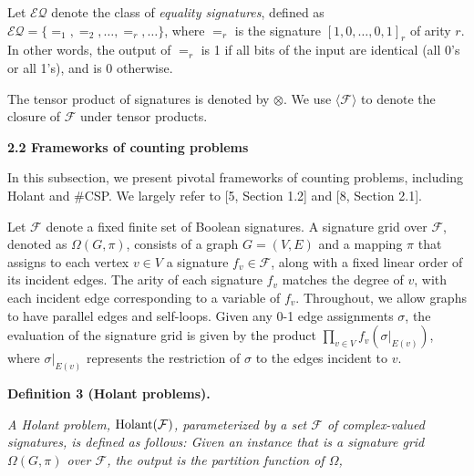 Let $\mathcal{EQ}$ denote the class of \emph{equality signatures}, defined as $\mathcal{EQ}=\{=_{1},=_{2},\ldots,=_{r},\ldots\}$, where $=_{r}$ is the signature $[1,0,\ldots,0,1]_{r}$ of arity $r$. In other words, the output of $=_{r}$ is 1 if all bits of the input are identical (all 0’s or all 1’s), and is 0 otherwise.\par




The tensor product of signatures is denoted by $\otimes$. We use $\langle\mathcal{F}\rangle$ to denote the closure of $\mathcal{F}$ under tensor products.\par





\par\medskip\noindent\textbf{
2.2 Frameworks of counting problems}\par




In this subsection, we present pivotal frameworks of counting problems, including Holant and \#CSP. We largely refer to [5, Section 1.2] and [8, Section 2.1].\par




Let $\mathcal{F}$ denote a fixed finite set of Boolean signatures. A signature grid over $\mathcal{F}$, denoted as $\Omega(G,\pi)$, consists of a graph $G=(V,E)$ and a mapping $\pi$ that assigns to each vertex $v\in V$ a signature $f_{v}\in\mathcal{F}$, along with a fixed linear order of its incident edges. The arity of each signature $f_{v}$ matches the degree of $v$, with each incident edge corresponding to a variable of $f_{v}$. Throughout, we allow graphs to have parallel edges and self-loops. Given any 0-1 edge assignments $\sigma$, the evaluation of the signature grid is given by the product $\prod_{v\in V}f_{v}(\sigma|_{E(v)})$, where $\sigma|_{E(v)}$ represents the restriction of $\sigma$ to the edges incident to $v$.\par





\par\medskip\noindent\textbf{
\textbf{Definition 3}\textbf{ }(Holant problems)\textbf{.}
}\par



\emph{A Holant problem, $\textup{{Holant}}(\mathcal{F})$, parameterized by a set $\mathcal{F}$ of complex-valued signatures, is defined as follows: Given an instance that is a signature grid $\Omega(G,\pi)$ over $\mathcal{F}$, the output is the partition function of $\Omega$,}\par


